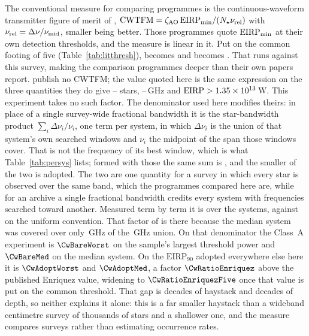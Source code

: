 The conventional measure for comparing programmes is the continuous-waveform
transmitter figure of merit of \citet{Enriquez2017},
$\mathrm{CWTFM}=\zeta_{\rm AO}\,\mathrm{EIRP}_{\rm min}/
(N_{\star}\nu_{\rm rel})$ with $\nu_{\rm rel}=\Delta\nu/\nu_{\rm mid}$,
smaller being better. Those programmes quote $\mathrm{EIRP}_{\rm min}$ at their own detection
thresholds, and the measure is linear in it. Put on the common footing of
five (Table~\ref{tab:litthresh}), \FomLitEnriquez{} becomes
\FomLitEnriquezFive{} and \FgLitMargot{} becomes \FgLitMargotFive. That runs
against this survey, making the comparison programmes deeper than their own
papers report. \citet{Margot2023} publish no
CWTFM; the value quoted here is the same expression on the three quantities
they do give -- \FomMargotN{} stars, \FomMargotLo--\FomMargotHi\,GHz and
$\mathrm{EIRP}>1.35\times10^{13}$\,W. This experiment takes no such factor. The
denominator used here modifies theirs: in place of a single survey-wide
fractional bandwidth it is the star-bandwidth product
$\sum_{i}\Delta\nu_{i}/\nu_{i}$, one term per system, in which
$\Delta\nu_{i}$ is the union of that system's own searched windows and
$\nu_{i}$ the midpoint of the span those windows cover. That is not the frequency of its best window, which is
what Table~\ref{tab:persys} lists; formed with those the same sum is
\CwSigmaBest, and the smaller of the two is adopted. The two are one quantity
for a survey in which every star is observed over the same band, which the
programmes compared here are, while for an archive a single fractional
bandwidth credits every system with frequencies searched toward another. Measured term by term it is \CwSigma{} over the \CwNSys{} systems, against
\CwUniform{} on the uniform convention. That factor of \CwRatio{} is there
because the median system was covered over only \SysUnionAMed\,GHz of the
\CvUnionA\,GHz union. On that denominator the Class~A experiment is
$\CwBareWorst$ on the sample's largest threshold power and $\CwBareMed$ on
the median system. On the $\mathrm{EIRP}_{90}$ adopted everywhere else here
it is $\CwAdoptWorst$ and $\CwAdoptMed$, a factor $\CwRatioEnriquez$ above
the published Enriquez value, widening to $\CwRatioEnriquezFive$ once that
value is put on the common threshold. That
gap is \CwBandDex{} decades of haystack and \CwEirpDex{} decades of depth, so
neither explains it alone: this is a far smaller haystack than a wideband
centimetre survey of thousands of stars and a shallower one, and the measure
compares surveys rather than estimating occurrence rates.

